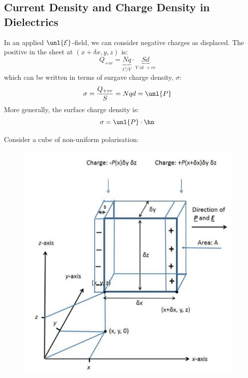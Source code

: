 \documentclass[a4paper, 11pt, normalem]{report}
\renewcommand\E{\mathcal{E}}
\newcommand\uE{\unl{\E}}
\begin{document}
\subsection{Current Density and Charge Density in Dielectrics}
In an applied $\uE$-field, we can consider negative charges as displaced.
The positive in the sheet at $(x+\delta x, y, z)$ is:
\begin{equation}
    Q_{+ve} = \underbrace{Nq}_{C/V} \cdot \underbrace{Sd}_{V \text{ of }+ve}
\end{equation}
which can be written in terms of surgave charge density, $\sigma$:
\begin{equation}
    \sigma = \frac{Q_{+ve}}{S} = Nqd = \unl{P}
\end{equation}
More generally, the surface charge density is:
\begin{equation}
    \sigma = \unl{P}\cdot\hn
\end{equation}

Consider a cube of non-uniform polarisation:

\begin{figure}
	\centering
	\includegraphics[scale=0.38]{dibox.png}
\end{figure}
\end{document}
